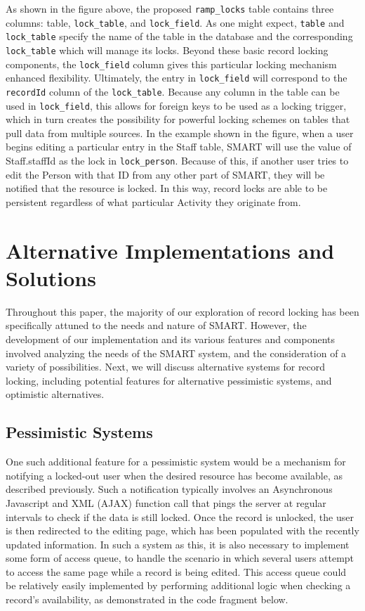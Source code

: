 \documentclass[12pt]{article}
\newcommand{\code}[1]{\texttt{#1}}
\begin{document}
As shown in the figure above, the proposed \code{ramp\_locks} table contains three columns: table, \code{lock\_table}, and \code{lock\_field}. As one might expect, \code{table} and \code{lock\_table} specify the name of the table in the database and the corresponding \code{lock\_table} which will manage its locks. Beyond these basic record locking components, the \code{lock\_field} column gives this particular locking mechanism enhanced flexibility. Ultimately, the entry in \code{lock\_field} will correspond to the \code{recordId} column of the \code{lock\_table}. Because any column in the table can be used in \code{lock\_field}, this allows for foreign keys to be used as a locking trigger, which in turn creates the possibility for powerful locking schemes on tables that pull data from multiple sources. In the example shown in the figure, when a user begins editing a particular entry in the Staff table, SMART will use the value of Staff.staffId as the lock in \code{lock\_person}. Because of this, if another user tries to edit the Person with that ID from any other part of SMART, they will be notified that the resource is locked. In this way, record locks are able to be persistent regardless of what particular Activity they originate from.

\section{Alternative Implementations and Solutions}

Throughout this paper, the majority of our exploration of record locking has been specifically attuned to the needs and nature of SMART. However, the development of our implementation and its various features and components involved analyzing the needs of the SMART system, and the consideration of a variety of possibilities. Next, we will discuss alternative systems for record locking, including potential features for alternative pessimistic systems, and optimistic alternatives.

\subsection{Pessimistic Systems}
One such additional feature for a pessimistic system would be a mechanism for notifying a locked-out user when the desired resource has become available, as described previously. Such a notification typically involves an Asynchronous Javascript and XML (AJAX) function call that pings the server at regular intervals to check if the data is still locked. Once the record is unlocked, the user is then redirected to the editing page, which has been populated with the recently updated information. In such a system as this, it is also necessary to implement some form of access queue, to handle the scenario in which several users attempt to access the same page while a record is being edited. This access queue could be relatively easily implemented by performing additional logic when checking a record’s availability, as demonstrated in the code fragment below.
\end{document}
